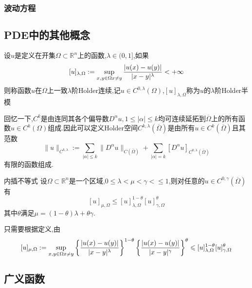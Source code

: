 \subsubsection{波动方程}
\subsection{PDE中的其他概念}
\begin{Definition}
    设$u$是定义在开集$\Omega\subset\mathbb{R}^n$上的函数,$\lambda\in (0,1]$,如果
    $$
    [u]_{\lambda,\Omega}:=\sup\limits_{x,y\in\Omega\\x\neq y }\frac{|u(x)-u(y)|}{|x-y|^{\lambda}}<+\infty
    $$
    则称函数$u$在$\Omega$上一致$\lambda$阶Holder连续,记$u\in C^{0,\lambda}(\Omega)$,$[u]_{\lambda,\Omega}$称为$u$的$\lambda$阶Holder半模
\end{Definition}
回忆一下,$C^{k}$是由连同其各个偏导数$D^{\alpha}u,1\leqslant|\alpha|\leqslant k$均可连续延拓到$\overline{\Omega}$上的所有函数$u\in C^k(\Omega)$组成.因此可以定义Holder空间$C^{k,\lambda}(\overline{\Omega})$是由所有$u\in C^k(\overline{\Omega})$且其范数
$$
\|u\|_{C^{k,\lambda}}:=\sum_{|\alpha|\leqslant k}\|D^{\alpha}u\|_{C(\overline{\Omega})}+\sum_{|\alpha|=k}[D^{\alpha}u]_{C^{0,\lambda}(\overline{\Omega})}
$$
有限的函数组成.
\begin{Theorem}{内插不等式}
    设$\Omega\subset\mathbb{R}^n$是一个区域,$0\leqslant \lambda<\mu<\gamma<\leqslant 1$,则对任意的$u\in C^{0,\gamma}(\overline{\Omega})$有
    $$
    [u]_{\mu,\Omega}\leqslant [u]_{\lambda,\Omega}^{1-\theta}[u]_{\gamma,\Omega}^\theta
    $$
    其中$\theta$满足$\mu=(1-\theta)\lambda+\theta\gamma$.
\end{Theorem}
只需要根据定义,由
$$
[u]_{\mu,\Omega}:=\sup\limits_{x,y\in\Omega\\x\neq y }\left\{\frac{|u(x)-u(y)|}{|x-y|^{\lambda}}\right\}^{1-\theta}\left\{\frac{|u(x)-u(y)|}{|x-y|^{\gamma}}\right\}^{\theta}\leqslant [u]_{\lambda,\Omega}^{1-\theta}[u]_{\gamma,\Omega}^\theta
$$






















\subsection{广义函数}
